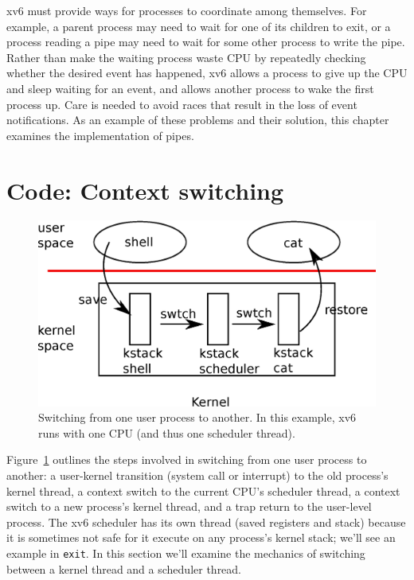 xv6 must provide
ways for processes to coordinate among themselves. For example,
a parent process may need to wait for one of its children to
exit, or a process reading a pipe may need to wait for
some other process to write the pipe.
Rather than make the waiting process waste CPU by repeatedly checking
whether the desired event has happened, xv6 allows a process to give
up the CPU and sleep
waiting for an event, and allows another process to wake the first
process up. Care is needed to avoid races that result in
the loss of event notifications.
As an example of these problems and their solution, this
chapter examines the implementation of pipes.
\section{Code: Context switching}

\begin{figure}[t]
\center
\includegraphics[scale=0.5]{fig/switch.eps}
\caption{Switching from one user process to another.  In this example, xv6 runs with one CPU (and thus one scheduler thread).}
\label{fig:switch}
\end{figure}

Figure~\ref{fig:switch} 
outlines the steps involved in switching from one
user process to another:
a user-kernel transition (system
call or interrupt) to the old process's kernel thread,
a context switch to the current CPU's scheduler thread, a context
switch to a new process's kernel thread, and a trap return
to the user-level process.
The xv6 scheduler has its own thread (saved registers and stack) because
it is sometimes not safe for it execute on
any process's kernel stack;
we'll see an example in
\lstinline{exit}.
In this section we'll examine the mechanics of switching
between a kernel thread and a scheduler thread.

